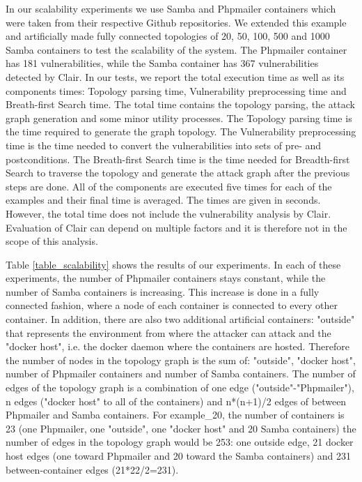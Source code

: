 In our scalability experiments we use Samba \cite{samba} and Phpmailer \cite{phpmailer} containers which were taken from their respective Github repositories. We extended this example and artificially made fully connected topologies of 20, 50, 100, 500 and 1000 Samba containers to test the scalability of the system. The Phpmailer container has 181 vulnerabilities, while the Samba container has 367 vulnerabilities detected by Clair. In our tests, we report the total execution time as well as its components times: Topology parsing time, Vulnerability preprocessing time and Breath-first Search time. The total time contains the topology parsing, the attack graph generation and some minor utility processes. The Topology parsing time is the time required to generate the graph topology. The Vulnerability preprocessing time is the time needed to convert the vulnerabilities into sets of pre- and postconditions. The Breath-first Search time is the time needed for Breadth-first Search to traverse the topology and generate the attack graph after the previous steps are done. All of the components are executed five times for each of the examples and their final time is averaged. The times are given in seconds.  However, the total time does not include the vulnerability analysis by Clair. Evaluation of Clair can depend on multiple factors and it is therefore not in the scope of this analysis.

Table \ref{table_scalability} shows the results of our experiments. In each of these experiments, the number of Phpmailer containers stays constant, while the number of Samba containers is increasing. This increase is done in a fully connected fashion, where a node of each container is connected to every other container. In addition, there are also two additional artificial containers: "outside" that represents the environment from where the attacker can attack and the "docker host", i.e. the docker daemon where the containers are hosted. Therefore the number of nodes in the topology graph is the sum of: "outside", "docker host", number of Phpmailer containers and number of Samba containers. The number of edges of the topology graph is a combination of one edge ("outside"-"Phpmailer"), n edges ("docker host" to all of the containers) and n*(n+1)/2 edges of between Phpmailer and Samba containers. For example\_20, the number of containers is 23 (one Phpmailer, one "outside", one "docker host" and 20 Samba containers) the number of edges in the topology graph would be 253: one outside edge, 21 docker host edges (one toward Phpmailer and 20 toward the Samba containers) and 231 between-container edges (21*22/2=231).


